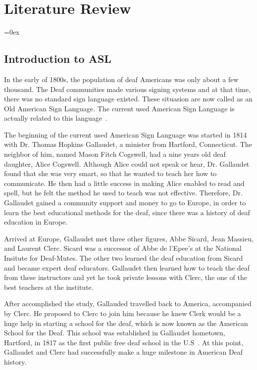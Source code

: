 \begin{flushright}
	
\end{flushright}\chapter{Literature Review}
\label{cha:2_literature}
\parskip=0ex

\section{Introduction to ASL}
\label{sec:1_intro}
In the early of 1800s, the population of deaf Americans was only about a few thousand. The Deaf communities made various signing systems and at that time, there was no standard sign language existed. These situasion are now called as an Old American Sign Language. The current used American Sign Language is actually related to this language~\cite{startAslCom}.

The beginning of the current used American Sign Language was started in 1814 with Dr. Thomas Hopkins Gallaudet, a minister from Hartford, Connecticut. The neighbor of him, named Mason Fitch Cogswell, had a nine years old deaf daughter, Alice Cogswell. Although Alice could not speak or hear, Dr. Gallaudet found that she was very smart, so that he wanted to teach her how to communicate. He then had a little success in making Alice enabled to read and spell, but he felt the method he used to teach was not effective. Therefore, Dr. Gallaudet gained a community support and money to go to Europe, in order to learn the best educational methods for the deaf, since there was a history of deaf education in Europe.

Arrived at Europe, Gallaudet met three other figures, Abbe Sicard, Jean Massieu, and Laurent Clerc. Sicard was a successor of Abbe de l'Epee's at the National Insitute for Deaf-Mutes. The other two learned the deaf education from Sicard and became expert deaf educators. Gallaudet then learned how to teach the deaf from these instructors and yet he took private lessons with Clerc, the one of the best teachers at the institute.

After accomplished the study, Gallauded travelled back to America, accompanied by Clerc. He proposed to Clerc to join him because he knew Clerk would be a huge help in starting a school for the deaf, which is now known as the American School for the Deaf. This school was established in Gallaudet hometown, Hartford, in 1817 as the first public free deaf school in the U.S~\cite{wiki:xxx}. At this point, Gallaudet and Clerc had successfully make a huge milestone in American Deaf history.

